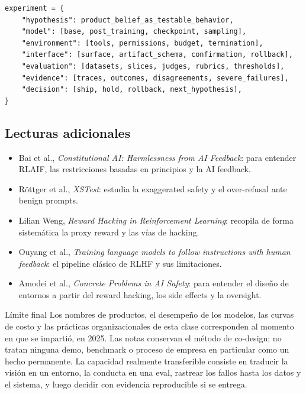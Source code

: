\documentclass[a4paper]{article}
\begin{document}
\begin{lstlisting}[caption={Registro reproducible de un experimento de Frontier product}]
experiment = {
    "hypothesis": product_belief_as_testable_behavior,
    "model": [base, post_training, checkpoint, sampling],
    "environment": [tools, permissions, budget, termination],
    "interface": [surface, artifact_schema, confirmation, rollback],
    "evaluation": [datasets, slices, judges, rubrics, thresholds],
    "evidence": [traces, outcomes, disagreements, severe_failures],
    "decision": [ship, hold, rollback, next_hypothesis],
}
\end{lstlisting}

\subsection{Lecturas adicionales}

\begin{itemize}
  \item Bai et al., \emph{Constitutional AI: Harmlessness from AI Feedback}: para entender RLAIF, las restricciones basadas en principios y la AI feedback.
  \item Röttger et al., \emph{XSTest}: estudia la exaggerated safety y el over-refusal ante benign prompts.
  \item Lilian Weng, \emph{Reward Hacking in Reinforcement Learning}: recopila de forma sistemática la proxy reward y las vías de hacking.
  \item Ouyang et al., \emph{Training language models to follow instructions with human feedback}: el pipeline clásico de RLHF y sus limitaciones.
  \item Amodei et al., \emph{Concrete Problems in AI Safety}: para entender el diseño de entornos a partir del reward hacking, los side effects y la oversight.
\end{itemize}

\begin{warningbox}{Límite final}
Los nombres de productos, el desempeño de los modelos, las curvas de costo y las prácticas organizacionales de esta clase corresponden al momento en que se impartió, en 2025. Las notas conservan el método de co-design; no tratan ninguna demo, benchmark o proceso de empresa en particular como un hecho permanente. La capacidad realmente transferible consiste en traducir la visión en un entorno, la conducta en una eval, rastrear los fallos hasta los datos y el sistema, y luego decidir con evidencia reproducible si se entrega.
\end{warningbox}
\end{document}
